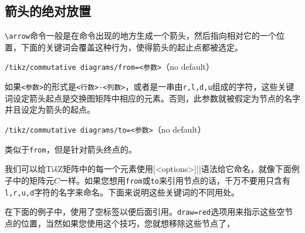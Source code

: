 \documentclass{ctexart}
\begin{document}
\subsection{箭头的绝对放置}
\verb|\arrow|命令一般是在命令出现的地方生成一个箭头，然后指向相对它的一个位置，下面的关键词会覆盖这种行为，使得箭头的起止点都被选定。
\par{\color{red}\texttt{/tikz/commutative diagrams/from=<参数>}}\hfill （no default）\par
如果\texttt{<参数>}的形式是\texttt{<行数>-<列数>}，或者是一串由\texttt{r,l,d,u}组成的字符，这些关键词设定箭头起点是交换图矩阵中相应的元素。否则，此参数就被假定为节点的名字并且设定为箭头的起点。
\par{\color{red}\texttt{/tikz/commutative diagrams/to=<参数>}}\hfill （no default）\par
类似于\verb|from|，但是针对箭头终点的。

我们可以给Ti\emph{k}Z矩阵中的每一个元素使用\verb||[<options>]||语法给它命名，就像下面例子中的矩阵元$C$一样。如果您想用\verb|from|或\verb|to|来引用节点的话，千万不要用只含有\verb|l,r,u,d|字符的名字来命名。下面来说明这些关键词的不同用处。
\begin{tcblisting}{}
\end{tcblisting}
在下面的例子中，使用了空标签以便后面引用。\verb|draw=red|选项用来指示这些空节点的位置，当然如果您使用这个技巧，您就想移除这些节点了，
\begin{tcblisting}{}
\end{tcblisting}
\begin{tcblisting}{}
\end{tcblisting}
\end{document}
